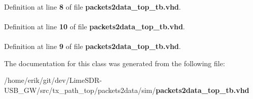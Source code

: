 \paragraph[{ieee}]{\hspace{0.3cm}{\ttfamily [Library]}}\label{classpackets2data__top__tb_a0a6af6eef40212dbaf130d57ce711256}


Definition at line {\bf 8} of file {\bf packets2data\+\_\+top\+\_\+tb.\+vhd}.

\paragraph[{numeric\+\_\+std}]{\hspace{0.3cm}{\ttfamily [Package]}}\label{classpackets2data__top__tb_a2edc34402b573437d5f25fa90ba4013e}


Definition at line {\bf 10} of file {\bf packets2data\+\_\+top\+\_\+tb.\+vhd}.

\paragraph[{std\+\_\+logic\+\_\+1164}]{\hspace{0.3cm}{\ttfamily [Package]}}\label{classpackets2data__top__tb_acd03516902501cd1c7296a98e22c6fcb}


Definition at line {\bf 9} of file {\bf packets2data\+\_\+top\+\_\+tb.\+vhd}.



The documentation for this class was generated from the following file\+:\begin{DoxyCompactItemize}
\item 
/home/erik/git/dev/\+Lime\+S\+D\+R-\/\+U\+S\+B\+\_\+\+G\+W/src/tx\+\_\+path\+\_\+top/packets2data/sim/{\bf packets2data\+\_\+top\+\_\+tb.\+vhd}\end{DoxyCompactItemize}
